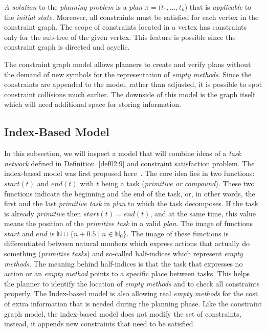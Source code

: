 \medskip\noindent
\emph{A solution} to the \emph{planning problem} is a \emph{plan} $\pi = (t_1, \dots, t_k$) that is \emph{applicable} to the \emph{initial state}. Moreover, all constraints must be satisfied for each vertex in the constraint graph. The scope of constraints located in a vertex has constraints only for the sub-tree of the given vertex. This feature is possible since the constraint graph is directed and acyclic.

\medskip\noindent
The constraint graph model allows planners to create and verify plans without the demand of new symbols for the representation of \emph{empty methods}. Since the constraints are appended to the model, rather than adjusted, it is possible to spot constraint collisions much earlier. The downside of this model is the graph itself which will need additional space for storing information.

\subsection{Index-Based Model}

\medskip\noindent
In this subsection, we will inspect a model that will combine ideas of a \emph{task network} defined in Definition~\ref{def02:9} and constraint satisfaction problem. The index-based model was first proposed here~\cite{ondrckova2023semantics}. The core idea lies in two functions: $start(t)$ and $end(t)$ with $t$ being a task (\emph{primitive or compound}). These two functions indicate the beginning and the end of the task, or, in other words, the first and the last \emph{primitive task} in \emph{plan} to which the task decomposes. If the task is already \emph{primitive} then $start(t) = end(t)$, and at the same time, this value means the position of the \emph{primitive task} in a valid \emph{plan}. The image of functions $start$ and $end$ is $\mathbb{N} \cup \{n + 0.5 \; | \; n \in \mathbb{N}_0\}$. The image of these functions is differentiated between natural numbers which express actions that actually do something (\emph{primitive tasks}) and so-called half-indices which represent \emph{empty methods}. The meaning behind half-indices is that the task that expresses no action or an \emph{empty method} points to a specific place between tasks. This helps the planner to identify the location of \emph{empty methods} and to check all constraints properly. The Index-based model is also allowing real \emph{empty methods} for the cost of extra information that is needed during the planning phase. Like the constraint graph model, the index-based model does not modify the set of constraints, instead, it appends new constraints that need to be satisfied.

